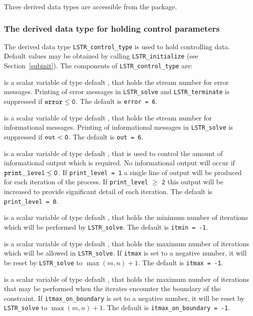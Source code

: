 \documentclass{galahad}
\newcommand{\packagename}{LS\-TR}
\begin{document}

\galtypes
Three derived data types are accessible from the package.


\subsubsection{The derived data type for holding control
 parameters}\label{typecontrol}
The derived data type
{\tt \packagename\_control\_type}
is used to hold controlling data. Default values may be obtained by calling
{\tt \packagename\_initialize}
(see Section~\ref{subinit}). The components of
{\tt \packagename\_control\_type}
are:

\begin{description}
 is a scalar variable of type default \integer, that holds the
stream number for error messages.
Printing of error messages in
{\tt \packagename\_solve} and {\tt \packagename\_terminate}
is suppressed if ${\tt error} \leq {\tt 0}$.
The default is {\tt error = 6}.

 is a scalar variable of type default \integer, that holds the
stream number for informational messages.
Printing of informational messages in
{\tt \packagename\_solve} is suppressed if ${\tt out} < {\tt 0}$.
The default is {\tt out = 6}.

 is a scalar variable of type default \integer,
that is used
to control the amount of informational output which is required. No
informational output will occur if ${\tt print\_level} \leq {\tt 0}$. If
{\tt print\_level = 1} a single line of output will be produced for each
iteration of the process. If {\tt print\_level} $\geq$ {\tt 2} this output
will be increased to provide significant detail of each iteration.
The default is {\tt print\_level = 0}.

 is a scalar variable of type default \integer, that holds the
minimum number of iterations which will be performed by
{\tt \packagename\_solve}.
The default is {\tt itmin = -1}.

 is a scalar variable of type default \integer, that holds the
maximum number of iterations which will be allowed in
{\tt \packagename\_solve}.
If {\tt itmax} is set to a negative number, it will be reset by
{\tt \packagename\_solve} to $\max(m,n)+1$.
The default is {\tt itmax = -1}.

 is a scalar variable of type default \integer,
that holds the
maximum number of iterations that may be performed when the iterates
encounter the boundary of the constraint.
If {\tt itmax\_on\_boundary} is set to a negative number, it will be reset by
{\tt \packagename\_solve} to $\max(m,n)+1$.
The default is {\tt itmax\_on\_boundary = -1}.


\end{description}
\end{document}
